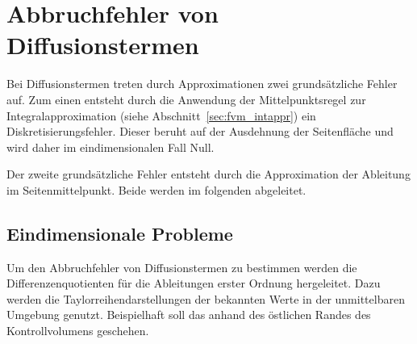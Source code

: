 \section{Abbruchfehler von Diffusionstermen}
\label{sec:Diffusionsterme}

Bei Diffusionstermen treten durch Approximationen zwei grundsätzliche Fehler auf.
Zum einen entsteht durch die Anwendung der Mittelpunktsregel zur Integralapproximation
(siehe Abschnitt~\ref{sec:fvm_intappr}) ein Diskretisierungsfehler.
Dieser beruht auf der Ausdehnung der Seitenfläche und wird daher im eindimensionalen Fall
Null.

Der zweite grundsätzliche Fehler entsteht durch die Approximation der Ableitung im
Seitenmittelpunkt. Beide werden im folgenden abgeleitet.
\subsection{Eindimensionale Probleme}
\label{sec:te_dif_1d}

Um den Abbruchfehler von Diffusionstermen zu bestimmen werden die Differenzenquotienten
für die Ableitungen erster Ordnung hergeleitet. Dazu werden die Taylorreihendarstellungen der bekannten
Werte in der unmittelbaren Umgebung genutzt. Beispielhaft soll das anhand des östlichen
Randes des Kontrollvolumens geschehen.

